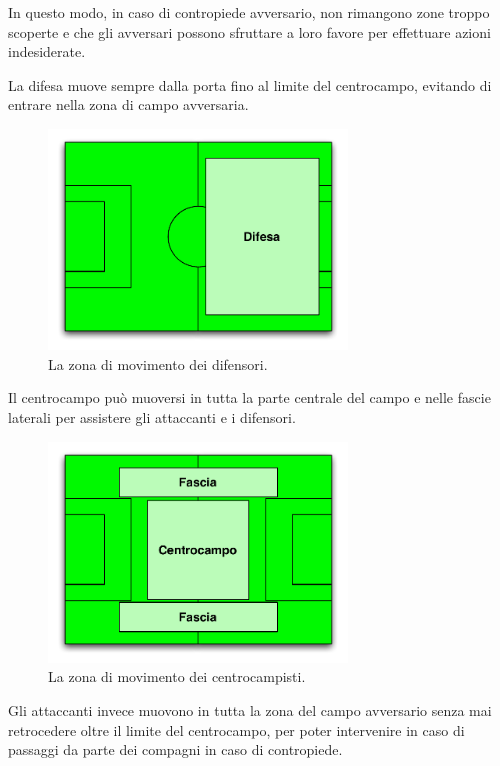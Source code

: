 \documentclass[aps,letterpaper,10pt]{article}
\begin{document}
In questo modo, in caso di contropiede avversario, non rimangono zone troppo scoperte e che gli avversari possono
sfruttare a loro favore per effettuare azioni indesiderate.

La difesa muove sempre dalla porta fino al limite del centrocampo, evitando di entrare nella zona di campo avversaria.

\begin{figure}[H]
	\begin{center}
		\includegraphics[width=300px]{images/defense.pdf}
	\end{center}
\caption{La zona di movimento dei difensori.}
\end{figure}

Il centrocampo pu\`o muoversi in tutta la parte centrale del campo e nelle fascie laterali per assistere gli attaccanti
e i difensori.

\begin{figure}[H]
	\begin{center}
		\includegraphics[width=300px]{images/middle.pdf}
	\end{center}
\caption{La zona di movimento dei centrocampisti.}
\end{figure}

Gli attaccanti invece muovono in tutta la zona del campo avversario senza mai retrocedere oltre il limite del
centrocampo, per poter intervenire in caso di passaggi da parte dei compagni in caso di contropiede.
\end{document}

